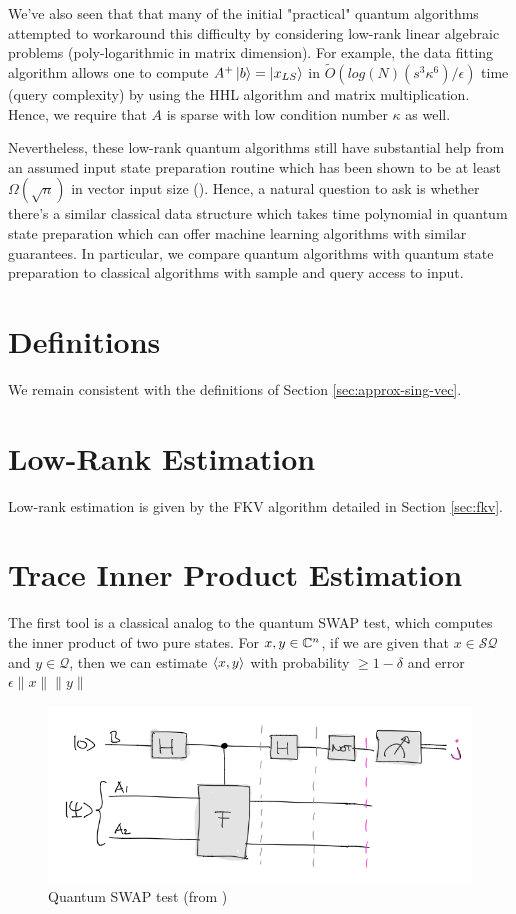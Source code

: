 \documentclass[main.tex]{subfiles}
\begin{document}
We've also seen that that many of the initial "practical" quantum algorithms attempted to workaround this difficulty by considering low-rank linear algebraic problems (poly-logarithmic in matrix dimension). For example, the data fitting algorithm \cite{wiebe2012quantum} allows one to compute $A^+ \ket{b} = \ket{x_{LS}}$ in $\tilde{O}(log(N)(s^3\kappa^6)/ \epsilon)$ time (query complexity) by using the HHL algorithm and matrix multiplication. Hence, we require that $A$ is sparse with low condition number $\kappa$ as well.

Nevertheless, these low-rank quantum algorithms still have substantial help from an assumed input state preparation routine which has been shown to be at least $\Omega(\sqrt{n})$ in vector input size (\cite{tang2018quantum}). Hence, a natural question to ask is whether there's a similar classical data structure which takes time polynomial in quantum state preparation which can offer machine learning algorithms with similar guarantees. In particular, we compare quantum algorithms with quantum state preparation to classical algorithms with sample and query access to input.	

\section{Definitions}

We remain consistent with the definitions of Section \ref{sec:approx-sing-vec}.

\section{Low-Rank Estimation}

Low-rank estimation is given by the FKV algorithm detailed in Section \ref{sec:fkv}.

\section{Trace Inner Product Estimation}

The first tool is a classical analog to the quantum SWAP test, which computes the inner product of two pure states. For $x, y \in \mathbb{C}^n$, if we are given that $x \in \mathcal{SQ}$ and $y \in \mathcal{Q}$, then we can estimate $\langle x, y\rangle$ with probability $\geq 1 - \delta$ and error $\epsilon \|x\|\|y\|$ 

\begin{figure}
\includegraphics[width= 0.5\linewidth]{images/swap_test.png}	
\caption{Quantum SWAP test (from \cite{walter})}
\end{figure}
\end{document}
